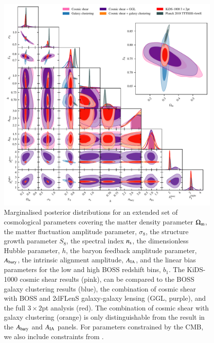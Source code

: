 \begin{figure}
	\begin{center}
		\includegraphics[width=\textwidth]{Parameter_Plots/cosmology/omegam_sigma8_s8_ns_h_a_baryon_a_ia_b1l_b1h_blind_C}
		\caption{Marginalised posterior distributions for an extended set of cosmological parameters covering the matter density parameter $\Omega_{\rm m}$, the matter fluctuation amplitude parameter, $\sigma_8$, the structure growth parameter $S_8$, the spectral index $n_{\rm s}$, the dimensionless Hubble parameter, $h$, the baryon feedback amplitude parameter, $A_{\rm bary}$, the intrinsic alignment amplitude, $A_{\rm IA}$, and the linear bias parameters for the low and high BOSS redshift bins, $b_1$.   The KiDS-1000 cosmic shear results (pink), can be compared to the BOSS galaxy clustering results (blue), the combination of cosmic shear with BOSS and 2dFLenS galaxy-galaxy lensing (GGL, purple), and the full $3\times2$pt analysis (red).  The combination of cosmic shear with galaxy clustering (orange) is only distinguishable from the \tttp result in the $A_{\rm bary}$ and $A_{\rm IA}$ panels.  For parameters constrained by the CMB, we also include constraints from \citet[][grey]{planck/etal:2018}.}
		\label{fig:cosmology-params-all}
	\end{center}
\end{figure}


